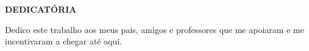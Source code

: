 \newpage
\thispagestyle{empty}

\begin{center}
\textbf{DEDICATÓRIA}
\end{center}

\vspace*{10 cm}

\hfill
\begin{minipage}{8cm}
Dedico este trabalho aos meus pais, amigos e professores que me apoiaram e me incentivaram a chegar até aqui.

\end{minipage}